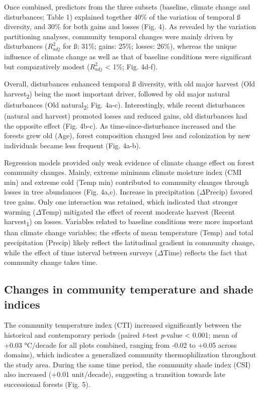 \documentclass[a4paperpaper,]{article}
\begin{document}
Once combined, predictors from the three subsets (baseline, climate
change and disturbances; Table 1) explained together 40\% of the
variation of temporal ß diversity, and 30\% for both gains and losses
(Fig. 4). As revealed by the variation partitioning analyses, community
temporal changes were mainly driven by disturbances (\(R^2_{adj}\) for
ß: 31\%; gains: 25\%; losses: 26\%), whereas the unique influence of
climate change as well as that of baseline conditions were significant
but comparatively modest (\(R^2_{adj}\) \textless{} 1\%; Fig. 4d-f).

Overall, disturbances enhanced temporal ß diversity, with old major
harvest (Old harvest\textsubscript{2}) being the most important driver,
followed by old major natural disturbances (Old
natural\textsubscript{2}; Fig. 4a-c). Interestingly, while recent
disturbances (natural and harvest) promoted losses and reduced gains,
old disturbances had the opposite effect (Fig. 4b-c). As
time-since-disturbance increased and the forests grew old (Age), forest
composition changed less and colonization by new individuals became less
frequent (Fig. 4a-b).

Regression models provided only weak evidence of climate change effect
on forest community changes. Mainly, extreme minimum climate moisture
index (CMI min) and extreme cold (Temp min) contributed to community
changes through losses in tree abundances (Fig. 4a,c). Increase in
precipitation (\(\Delta\)Precip) favored tree gains. Only one
interaction was retained, which indicated that stronger warming
(\(\Delta\)Temp) mitigated the effect of recent moderate harvest (Recent
harvest\textsubscript{1}) on losses. Variables related to baseline
conditions were more important than climate change variables; the
effects of mean temperature (Temp) and total precipitation (Precip)
likely reflect the latitudinal gradient in community change, while the
effect of time interval between surveys (\(\Delta\)Time) reflects the
fact that community change takes time.

\hypertarget{changes-in-community-temperature-and-shade-indices}{%
\subsection{Changes in community temperature and shade
indices}\label{changes-in-community-temperature-and-shade-indices}}

The community temperature index (CTI) increased significantly between
the historical and contemporary periods (paired \emph{t}-test
\emph{p}-value \textless{} 0.001; mean of +0.03 °C/decade for all plots
combined, ranging from -0.02 to +0.05 across domains), which indicates a
generalized community thermophilization throughout the study area.
During the same time period, the community shade index (CSI) also
increased (+0.01 unit/decade), suggesting a transition towards late
successional forests (Fig. 5).
\end{document}
